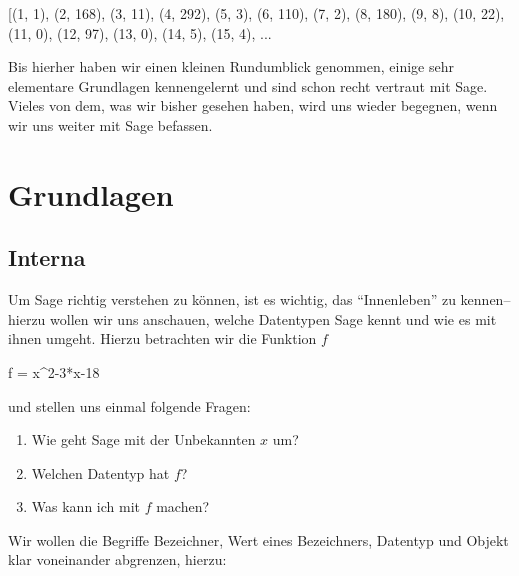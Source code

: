 \documentclass[fontsize=12pt,paper=a4,twoside,bibtotoc,idxtotoc,
liststotoc,pagesize,BCOR1.2cm,DIV15,chapterprefix,pagesize=pdftex]{scrbook}
\theoremstyle{plain}
\theoremstyle{definition}
\theoremstyle{remark}
\begin{document}
\begin{sage}
[(1, 1), (2, 168), (3, 11), (4, 292), (5, 3), (6, 110), (7, 2), (8,
180), (9, 8), (10, 22), (11, 0), (12, 97), (13, 0), (14, 5), (15, 4),
...
\end{sage}
Bis hierher haben wir einen kleinen Rundumblick genommen, einige sehr elementare Grundlagen kennengelernt und sind schon recht vertraut mit 
Sage. Vieles von dem, was wir bisher gesehen haben, wird uns wieder begegnen, wenn wir uns weiter mit Sage befassen.
\chapter{Grundlagen}
\section{Interna}
Um Sage richtig verstehen zu können, ist es wichtig, das ``Innenleben'' zu kennen-- hierzu wollen wir uns anschauen, welche Datentypen Sage 
kennt und wie es mit ihnen umgeht. Hierzu betrachten wir die Funktion $f$
\begin{sagein}
f = x^2-3*x-18
\end{sagein}
und stellen uns einmal folgende Fragen:
\begin{enumerate}
 \item Wie geht Sage mit der Unbekannten $x$ um?
 \item Welchen Datentyp hat $f$?
 \item Was kann ich mit $f$ machen?
\end{enumerate}
Wir wollen die Begriffe Bezeichner, Wert eines Bezeichners, Datentyp und Objekt klar voneinander abgrenzen, hierzu:
\end{document}
